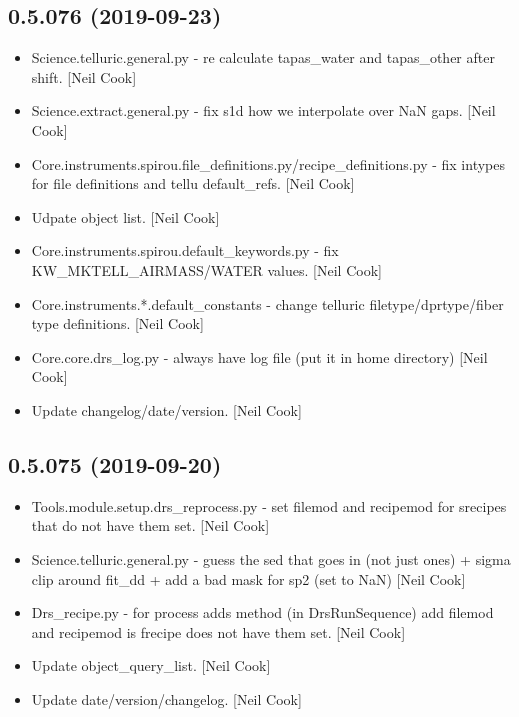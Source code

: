 \documentclass[a4paper,10pt,english]{report}
\begin{document}
\subsection{0.5.076 (2019-09-23)}
\label{\detokenize{misc/changelog:id65}}\begin{itemize}
\item {} 
Science.telluric.general.py - re calculate tapas\_water and tapas\_other
after shift. {[}Neil Cook{]}

\item {} 
Science.extract.general.py - fix s1d how we interpolate over NaN gaps.
{[}Neil Cook{]}

\item {} 
Core.instruments.spirou.file\_definitions.py/recipe\_definitions.py -
fix intypes for file definitions and tellu default\_refs. {[}Neil Cook{]}

\item {} 
Udpate object list. {[}Neil Cook{]}

\item {} 
Core.instruments.spirou.default\_keywords.py - fix
KW\_MKTELL\_AIRMASS/WATER values. {[}Neil Cook{]}

\item {} 
Core.instruments.*.default\_constants - change telluric
filetype/dprtype/fiber type definitions. {[}Neil Cook{]}

\item {} 
Core.core.drs\_log.py - always have log file (put it in home directory)
{[}Neil Cook{]}

\item {} 
Update changelog/date/version. {[}Neil Cook{]}

\end{itemize}


\subsection{0.5.075 (2019-09-20)}
\label{\detokenize{misc/changelog:id66}}\begin{itemize}
\item {} 
Tools.module.setup.drs\_reprocess.py - set filemod and recipemod for
srecipes that do not have them set. {[}Neil Cook{]}

\item {} 
Science.telluric.general.py - guess the sed that goes in (not just
ones) + sigma clip around fit\_dd + add a bad mask for sp2 (set to NaN)
{[}Neil Cook{]}

\item {} 
Drs\_recipe.py - for process adds method (in DrsRunSequence) add
filemod and recipemod is frecipe does not have them set. {[}Neil Cook{]}

\item {} 
Update object\_query\_list. {[}Neil Cook{]}

\item {} 
Update date/version/changelog. {[}Neil Cook{]}

\end{itemize}
\end{document}
